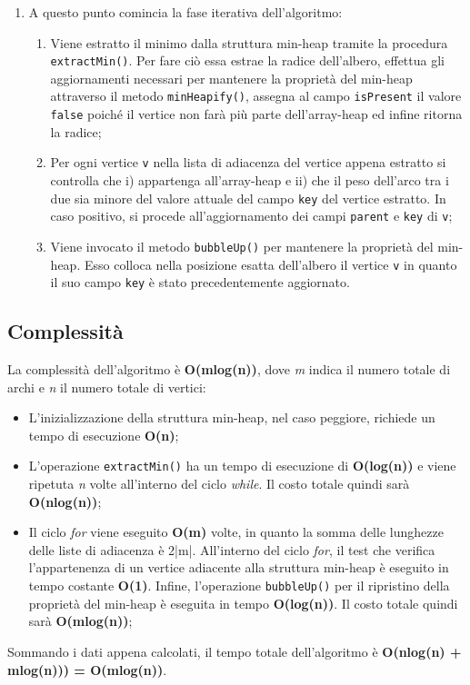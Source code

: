 \begin{itemize}
\begin{enumerate}
		\item A questo punto comincia la fase iterativa dell'algoritmo:
		\begin{enumerate}
			\item Viene estratto il minimo dalla struttura min-heap tramite la procedura \texttt{extractMin()}. Per fare ciò essa estrae la radice dell'albero, effettua gli aggiornamenti necessari per mantenere la proprietà del min-heap attraverso il metodo \texttt{minHeapify()}, assegna al campo \texttt{isPresent} il valore \texttt{false} poiché il vertice non farà più parte dell'array-heap ed infine ritorna la radice;
			\item Per ogni vertice \texttt{v} nella lista di adiacenza del vertice appena estratto si controlla che i) appartenga all'array-heap e ii) che il peso dell'arco tra i due sia minore del valore attuale del campo \texttt{key} del vertice estratto. In caso positivo, si procede all'aggiornamento dei campi \texttt{parent} e \texttt{key} di \texttt{v};
			\item Viene invocato il metodo \texttt{bubbleUp()} per mantenere la proprietà del min-heap. Esso colloca nella posizione esatta dell'albero il vertice \texttt{v} in quanto il suo campo \texttt{key} è stato precedentemente aggiornato.
		\end{enumerate} 
	\end{enumerate}
\end{itemize}

\subsection{Complessità}
La complessità dell'algoritmo è \textbf{O(mlog(n))}, dove \emph{m} indica il numero totale di archi e \emph{n} il numero totale di vertici:
\begin{itemize}
	\item L'inizializzazione della struttura min-heap, nel caso peggiore, 	richiede un tempo di esecuzione \textbf{O(n)};
	\item L'operazione \texttt{extractMin()} ha un tempo di esecuzione di \textbf{O(log(n))} e viene ripetuta \emph{n} volte all'interno del ciclo \emph{while}. Il costo totale quindi sarà \textbf{O(nlog(n))};
	\item Il ciclo \emph{for} viene eseguito \textbf{O(m)} volte, in quanto la somma delle lunghezze delle liste di adiacenza è 2|m|. All'interno del ciclo \emph{for}, il test che verifica l'appartenenza di un vertice adiacente alla struttura min-heap è eseguito in tempo costante \textbf{O(1)}. Infine, l'operazione \texttt{bubbleUp()} per il ripristino della proprietà del min-heap è eseguita in tempo \textbf{O(log(n))}. Il costo totale quindi sarà \textbf{O(mlog(n))};
\end{itemize}
Sommando i dati appena calcolati, il tempo totale dell'algoritmo è \textbf{O(nlog(n) + mlog(n))) = O(mlog(n))}.
\pagebreak